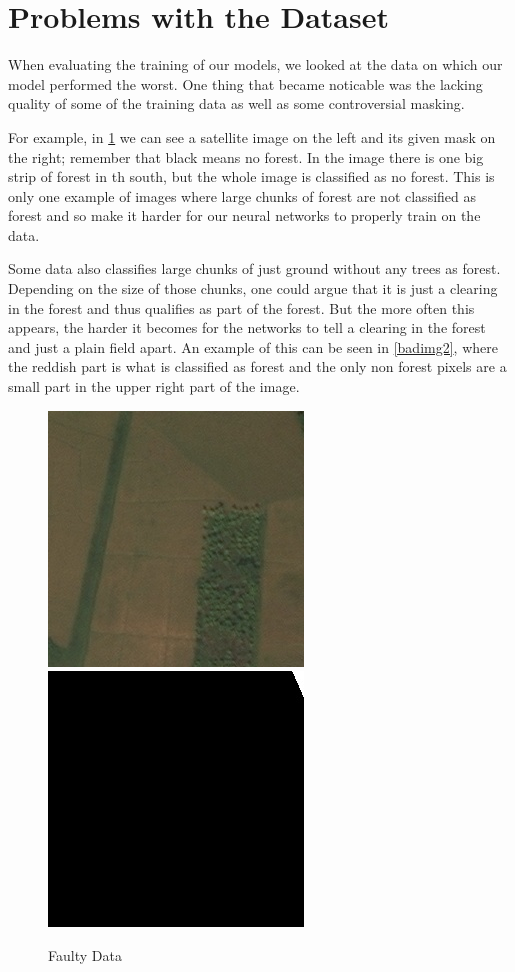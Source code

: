   \section{Problems with the Dataset}
  When evaluating the training of our models, we looked at the data on which our model performed the worst. One thing that became noticable was the lacking quality of some of the training data as well as some controversial masking.

  For example, in \ref{badimg} we can see a satellite image on the left and its given mask on the right; remember that black means no forest. In the image there is one big strip of forest in th south, but the whole image is classified as no forest. This is only one example of images where large chunks of forest are not classified as forest and so make it harder for our neural networks to properly train on the data.

  Some data also classifies large chunks of just ground without any trees as forest. Depending on the size of those chunks, one could argue that it is just a clearing in the forest and thus qualifies as part of the forest. But the more often this appears, the harder it becomes for the networks to tell a clearing in the forest and just a plain field apart. An example of this can be seen in \ref{badimg2}, where the reddish part is what is classified as forest and the only non forest pixels are a small part in the upper right part of the image.

  \begin{figure}
    \begin{center}
    \label{badimg}
    \includegraphics[width=.4\linewidth]{images/satellite_images/1_imag}
    \includegraphics[width=.4\linewidth]{images/satellite_images/1_mask}
    \caption{Faulty Data}
    \end{center}
  \end{figure}

